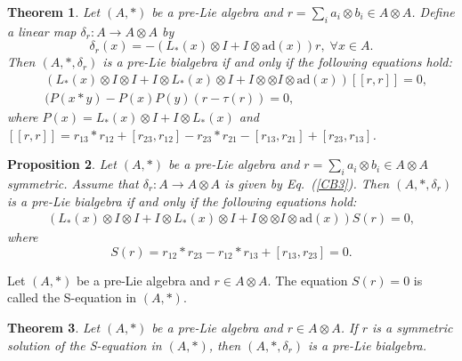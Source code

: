 \documentclass[12pt]{amsart}
\newtheorem{thm}{Theorem}[section]
\newtheorem{pro}[thm]{Proposition}
\theoremstyle{definition}
\begin{document}
\begin{thm}\label{Cg3}
Let $(A,\ast)$ be a pre-Lie algebra and
$r=\sum_{i}a_{i}\otimes b_{i}\in A\otimes A$. Define a linear map
$\delta_{r}:A\rightarrow A\otimes A$ by 
\begin{equation}\label{CB3}
		\delta_{r}(x)=-(L_{\ast}(x)\otimes I+I\otimes \mathrm{ad}(x))r,\;\forall x\in A.\end{equation}
Then $(A,\ast,\delta_{r})$ is a pre-Lie bialgebra if and only if the following equations hold:
\begin{align}&\label{Pa6}(L_\ast(x) \otimes I\otimes I+I\otimes L_\ast(x) \otimes I+I \otimes \otimes I\otimes \mathrm{ad}(x))[[r,r]]=0,
\\&\label{Pa7}(P(x\ast y)-P(x)P(y)(r-\tau(r))=0,
\end{align}
where $P(x)=L_\ast(x) \otimes I+I\otimes L_\ast(x)$ and
$[[r,r]]=r_{13}\ast r_{12}+[r_{23},r_{12}]-r_{23}\ast r_{21}-[r_{13},r_{21}]+[r_{23},r_{13}]$.
\end{thm}

\begin{pro} \label{Cg4}
Let $(A,\ast)$ be a pre-Lie algebra and $r=\sum\limits_{i}a_{i}\otimes b_{i}\in A\otimes A$ symmetric.
Assume that $\delta_{r}:A\longrightarrow A\otimes A$ is given
by Eq.~(\ref{CB3}).
Then $(A, \ast,\delta_{r})$ 
 is a pre-Lie bialgebra if and only if
  the following equations hold:
\begin{align}\label{Ly1}(L_\ast(x) \otimes I\otimes I+I\otimes L_\ast(x) \otimes I+I \otimes \otimes I\otimes \mathrm{ad}(x))S(r)=0,
\end{align}
where \begin{equation*}
S(r)=r_{12}\ast r_{23}-r_{12}\ast r_{13}+[r_{13}, r_{23}]=0.\end{equation*}
\end{pro}

Let $(A,\ast)$ be a pre-Lie algebra and $r\in A\otimes A$. The equation 
$S(r)=0$ is called the S-equation in $(A,\ast)$.
 
\begin{thm} \label{Pb1}
	Let $(A,\ast)$ be a pre-Lie algebra and $r\in A\otimes A$. If $r$ is a symmetric solution of 
the S-equation in $(A,\ast)$, then $(A,\ast,\delta_r)$ is a pre-Lie bialgebra. 
\end{thm}
 
\end{document}
